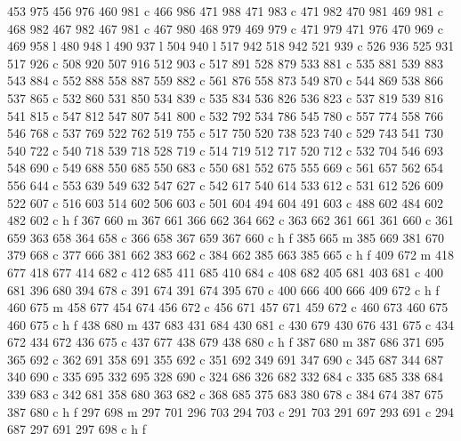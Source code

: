 {{        453 975 456 976 460 981 c
        466 986 471 988 471 983 c
        471 982 470 981 469 981 c
        468 982 467 982 467 981 c
        467 980 468 979 469 979 c
        471 979 471 976 470 969 c
        469 958 l
        480 948 l
        490 937 l
        504 940 l
        517 942 518 942 521 939 c
        526 936 525 931 517 926 c
        508 920 507 916 512 903 c
        517 891 528 879 533 881 c
        535 881 539 883 543 884 c
        552 888 558 887 559 882 c
        561 876 558 873 549 870 c
        544 869 538 866 537 865 c
        532 860 531 850 534 839 c
        535 834 536 826 536 823 c
        537 819 539 816 541 815 c
        547 812 547 807 541 800 c
        532 792 534 786 545 780 c
        557 774 558 766 546 768 c
        537 769 522 762 519 755 c
        517 750 520 738 523 740 c
        529 743 541 730 540 722 c
        540 718 539 718 528 719 c
        514 719 512 717 520 712 c
        532 704 546 693 548 690 c
        549 688 550 685 550 683 c
        550 681 552 675 555 669 c
        561 657 562 654 556 644 c
        553 639 549 632 547 627 c
        542 617 540 614 533 612 c
        531 612 526 609 522 607 c
        516 603 514 602 506 603 c
        501 604 494 604 491 603 c
        488 602 484 602 482 602 c
        h f
        367 660 m
        367 661 366 662 364 662 c
        363 662 361 661 361 660 c
        361 659 363 658 364 658 c
        366 658 367 659 367 660 c
        h f
        385 665 m
        385 669 381 670 379 668 c
        377 666 381 662 383 662 c
        384 662 385 663 385 665 c
        h f
        409 672 m
        418 677 418 677 414 682 c
        412 685 411 685 410 684 c
        408 682 405 681 403 681 c
        400 681 396 680 394 678 c
        391 674 391 674 395 670 c
        400 666 400 666 409 672 c
        h f
        460 675 m
        458 677 454 674 456 672 c
        456 671 457 671 459 672 c
        460 673 460 675 460 675 c
        h f
        438 680 m
        437 683 431 684 430 681 c
        430 679 430 676 431 675 c
        434 672 434 672 436 675 c
        437 677 438 679 438 680 c
        h f
        387 680 m
        387 686 371 695 365 692 c
        362 691 358 691 355 692 c
        351 692 349 691 347 690 c
        345 687 344 687 340 690 c
        335 695 332 695 328 690 c
        324 686 326 682 332 684 c
        335 685 338 684 339 683 c
        342 681 358 680 363 682 c
        368 685 375 683 380 678 c
        384 674 387 675 387 680 c
        h f
        297 698 m
        297 701 296 703 294 703 c
        291 703 291 697 293 691 c
        294 687 297 691 297 698 c
        h f
}}
